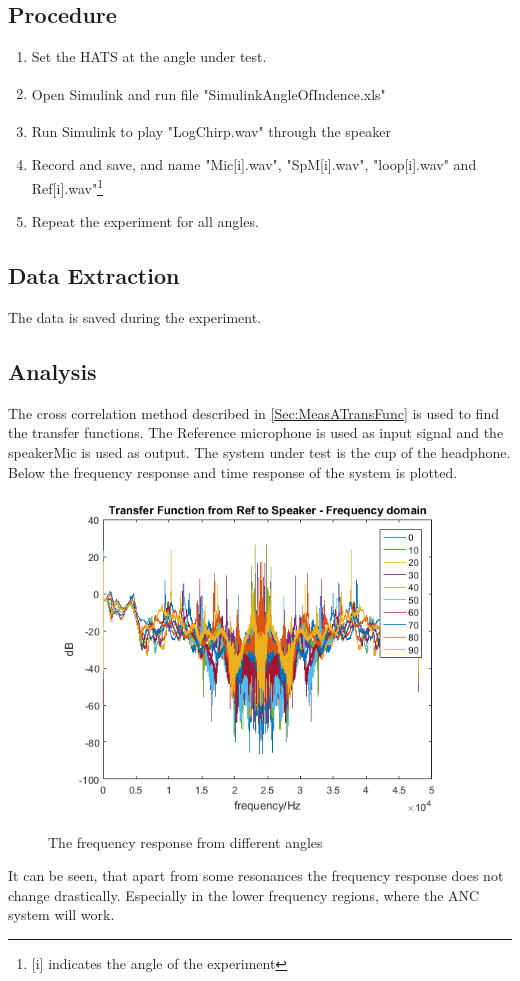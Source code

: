 \subsection{Procedure}
\begin{enumerate}
	\item Set the HATS at the angle under test. 
	\item Open Simulink\textsuperscript{\textregistered} and run file "SimulinkAngleOfIndence.xls"
	\item Run Simulink\textsuperscript{\textregistered} to play "LogChirp.wav" through the speaker
	\item Record and save, and name "Mic[i].wav", "SpM[i].wav", "loop[i].wav" and Ref[i].wav"\footnote{[i] indicates the angle of the experiment}
	\item Repeat the experiment for all angles.
\end{enumerate}

\subsection{Data Extraction}
The data is saved during the experiment.

\subsection{Analysis}
The cross correlation method described in \autoref{Sec:MeasATransFunc} is used to find the transfer functions. The Reference microphone is used as input signal and the speakerMic is used as output. The system under test is the cup of the headphone. 
Below the frequency response and time response of the system is plotted. 
\begin{figure}[H]
	\includegraphics[width=\textwidth]{../Journal/Experiments/AngleOfIncidence/AngOfIncFreq.png}
	\label{Fig:AngOfIncFreq}
	\caption{The frequency response from different angles}
\end{figure}
It can be seen, that apart from some resonances the frequency response does not change drastically. Especially in the lower frequency regions, where the ANC system will work. 

